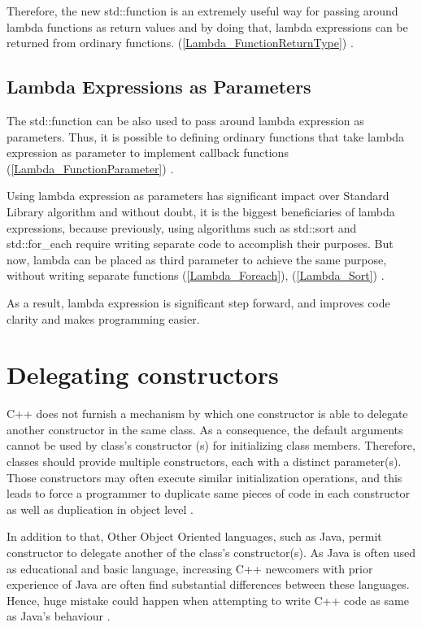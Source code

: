 \documentclass[11pt]{report}
\begin{document}
Therefore, the new std::function is an extremely useful way for passing around lambda functions as return values and by doing that, lambda expressions can be returned from ordinary functions. (\ref{Lambda_FunctionReturnType}) \cite{Josuttis:2012:CppStandard}.


\subsection{Lambda Expressions as Parameters}
\label{subsection: Lambda Expressions as Parameters}
The std::function can be also used to pass around lambda expression as parameters. Thus, it is possible to defining ordinary functions that take lambda expression as parameter to implement callback functions (\ref{Lambda_FunctionParameter}) \cite{Allain:2011:FutureCpp}.


Using lambda expression as parameters has significant impact over Standard Library algorithm and without doubt, it is the biggest beneficiaries of lambda expressions, because previously, using algorithms such as std::sort and std::for\_each require writing separate code to accomplish their purposes. But now, lambda can be placed as third parameter to achieve the same purpose, without writing separate functions (\ref{Lambda_Foreach}), (\ref{Lambda_Sort}) \cite {Gregorie:professionalcpp}.


As a result, lambda expression is significant step forward, and improves code clarity and makes programming easier.

\section{Delegating constructors}
\label{section: Delegating constructors}
C++ does not furnish a mechanism by which one constructor is able to delegate another constructor in the same class.  As a consequence, the default arguments cannot be used by class's constructor (s) for initializing class members. Therefore, classes should provide multiple constructors, each with a distinct parameter(s). Those constructors may often execute similar initialization operations, and this leads to force a programmer to duplicate same pieces of code in each constructor as well as duplication in object level \cite{Overland:2011:CWF}.


In addition to that, Other Object Oriented languages, such as Java, permit constructor to delegate another of the class's constructor(s). As Java is often used as educational and basic language, increasing C++ newcomers with prior experience of Java are often find substantial differences between these languages. Hence, huge mistake could happen when attempting to write C++ code as same as Java's behaviour \cite{Overland:2011:CWF}.
\end{document}
